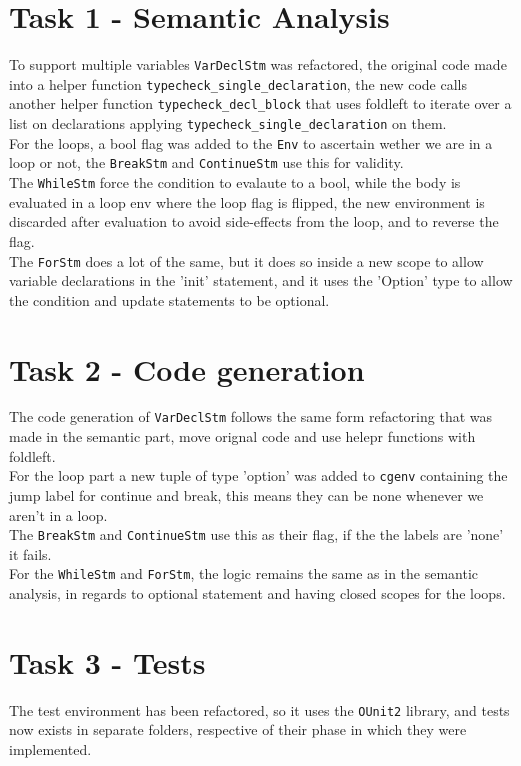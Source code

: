 \documentclass[12pt]{article}
\begin{document}
\section*{Task 1 - Semantic Analysis}
To support multiple variables \texttt{VarDeclStm} was refactored, the original code made into a helper function \texttt{typecheck\_single\_declaration}, the new code calls another helper function 
\texttt{typecheck\_decl\_block} that uses foldleft to iterate over a list on declarations applying \texttt{typecheck\_single\_declaration} on them.\\
\newline
For the loops, a bool flag was added to the \texttt{Env} to ascertain wether we are in a loop or not, the \texttt{BreakStm} and \texttt{ContinueStm} use this for validity.\\
The \texttt{WhileStm} force the condition to evalaute to a bool, while the body is evaluated in a loop env where the loop flag is flipped, the new environment is discarded after evaluation to avoid side-effects from the loop, and to reverse the flag.\\
The \texttt{ForStm} does a lot of the same, but it does so inside a new scope to allow variable declarations in the 'init' statement, and it uses the 'Option' type to allow the condition and update statements to be optional.

\section*{Task 2 - Code generation}
The code generation of \texttt{VarDeclStm} follows the same form refactoring that was made in the semantic part, move orignal code and use helepr functions with foldleft.\\
\newline
For the loop part a new tuple of type 'option' was added to \texttt{cgenv} containing the jump label for continue and break, this means they can be none whenever we aren't in a loop.\\
The \texttt{BreakStm} and \texttt{ContinueStm} use this as their flag, if the the labels are 'none' it fails.\\
For the \texttt{WhileStm} and \texttt{ForStm}, the logic remains the same as in the semantic analysis, in regards to optional statement and having closed scopes for the loops.\\


\section*{Task 3 - Tests}
The test environment has been refactored, so it uses the \texttt{OUnit2} library, and tests now exists in separate folders, respective of their phase in which they were implemented.\\
\end{document}
